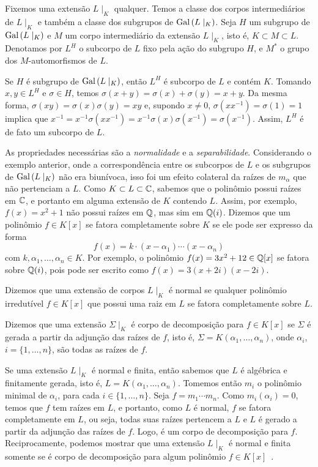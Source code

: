 Fixemos uma extensão $L\mid_K$ qualquer. Temos a classe dos corpos intermediários de $L\mid_K$ e também a classe dos subgrupos de $\textrm{Gal}\left({L}\mid_{K}\right)$. Seja $H$ um subgrupo de $\textrm{Gal}\left({L}\mid_{K}\right)$ e $M$ um corpo intermediário da extensão $L\mid_K$, isto é, $K \subset M \subset L$. Denotamos por $L^H$ o subcorpo de $L$ fixo pela ação do subgrupo $H$, e $M^*$ o grupo dos $M$-automorfismos de $L$. \par 
Se $H$ é subgrupo de $\textrm{Gal}\left({L}\mid_{K}\right)$, então $L^H$ é subcorpo de $L$ e contém $K$. Tomando $x,y \in L^H$ e $\sigma \in H$, temos $\sigma(x+y)=\sigma(x)+\sigma(y)=x+y$. Da mesma forma, $\sigma(xy) = \sigma(x)\sigma(y) = xy$ e, supondo $x\neq 0$, $\sigma(xx^{-1})=\sigma(1) = 1$ implica que $x^{-1}=x^{-1}\sigma(xx^{-1}) = x^{-1} \sigma(x) \sigma(x^{-1})=\sigma(x^{-1})$. Assim, $L^H$ é de fato um subcorpo de $L$.\par
As propriedades necessárias são a \emph{normalidade} e a \emph{separabilidade}. Considerando o exemplo anterior, onde a correspondência entre os subcorpos de $L$ e os subgrupos de $\textrm{Gal}\left({L}\mid_{K}\right)$ não era biunívoca, isso foi um efeito colateral da raízes de $m_\alpha$ que não pertenciam a $L$. Como $K \subset L \subset \mathbb{C}$, sabemos que o polinômio possui raízes em $\mathbb{C}$, e portanto em alguma extensão de $K$ contendo $L$. Assim, por exemplo, $f(x)=x^2+1$ não possui raízes em $\mathbb{Q}$, mas sim em $\mathbb{Q}(i)$. Dizemos que um polinômio $f \in K[x]$ se fatora completamente sobre $K$ se ele pode ser expresso da forma \[f(x) = k \cdot (x-\alpha_1)\cdots(x-\alpha_n)\] com $k, \alpha_1,\dots,\alpha_n \in K$. Por exemplo, o polinômio $f(x)= 3x^2+12 \in \mathbb{Q}[x]$  se fatora sobre $\mathbb{Q}(i)$, pois pode ser escrito como $f(x)=3(x+2i)(x-2i)$. \par
\begin{defn}
Dizemos que uma extensão de corpos $L\mid_K$ é normal se qualquer polinômio irredutível $f \in K[x]$ que possui uma raiz em $L$ se fatora completamente sobre $L$.
\end{defn}
Dizemos que uma extensão $\Sigma\mid_K$ é corpo de decomposição para $f \in K[x]$ se $\Sigma$ é gerada a partir da adjunção das raízes de $f$, isto é, $\Sigma=K(\alpha_1, \dots, \alpha_n)$, onde $\alpha_i$, $i=\{1, \dots, n\}$, são todas as raízes de $f$. \par 
Se uma extensão $L\mid_K$ é normal e finita, então sabemos que $L$ é algébrica e finitamente gerada, isto é, $L=K(\alpha_1,\dots,\alpha_n)$. Tomemos então $m_i$ o polinômio minimal de $\alpha_i$, para cada $i\in \{1,\dots, n\}$. Seja $f=m_1\cdots m_n$. Como $m_i(\alpha_i)=0$, temos que $f$ tem raízes em $L$, e portanto, como $L$ é normal, $f$ se fatora completamente em $L$, ou seja, todas suas raízes pertencem a $L$ e $L$ é gerado a partir da adjunção das raízes de $f$. Logo, é um corpo de decomposição para $f$. Reciprocamente, podemos mostrar que uma extensão $L\mid_K$ é normal e finita somente se é corpo de decomposição para algum polinômio $f \in K[x]$~\cite[Theorem 9.9.]{stewart}. \par

